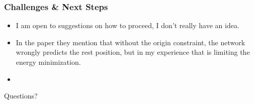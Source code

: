\documentclass{beamer}
\begin{document}




\begin{frame}
    \frametitle{Challenges \& Next Steps}
        \begin{itemize}
            \item I am open to suggestions on how to proceed, I don't really have an idea.
            \item In the paper they mention that without the origin constraint, the network wrongly predicts the rest position, but in my experience that is limiting the energy minimization.
            \item 
        \end{itemize}
\end{frame}

\begin{frame}
    \begin{center}
        \color{blue} \Huge{Questions?}
    \end{center}

\end{frame}
\end{document}
